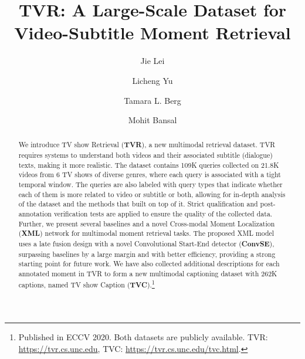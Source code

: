 \documentclass[runningheads]{llncs}
\begin{document}
\pagestyle{headings}
\mainmatter
\def\ECCVSubNumber{100}  

\title{TVR: A Large-Scale Dataset for Video-Subtitle Moment Retrieval} 

\begin{comment}
\titlerunning{ECCV-20 submission ID \ECCVSubNumber} 
\authorrunning{ECCV-20 submission ID \ECCVSubNumber} 
\author{Anonymous ECCV submission}
\institute{Paper ID \ECCVSubNumber}
\end{comment}


\author{Jie Lei \and Licheng Yu \and Tamara L. Berg \and Mohit Bansal}
\maketitle

\begin{abstract}
We introduce TV show Retrieval (\textbf{TVR}), a new multimodal retrieval dataset.
TVR requires systems to understand both videos and their associated subtitle (dialogue) texts, making it more realistic.
The dataset contains 109K queries collected on 21.8K videos from 6 TV shows of diverse genres, where each query is associated with a tight temporal window. 
The queries are also labeled with query types that indicate whether each of them is more related to video or subtitle or both, allowing for in-depth analysis of the dataset and the methods that built on top of it.
Strict qualification and post-annotation verification tests are applied to ensure the quality of the collected data. 
Further, we present several baselines and a novel Cross-modal Moment Localization (\textbf{XML}) network for multimodal moment retrieval tasks.
The proposed XML model uses a late fusion design with a novel Convolutional Start-End detector (\textbf{ConvSE}), surpassing baselines by a large margin and with better efficiency, providing a strong starting point for future work.
We have also collected additional descriptions for each annotated moment in TVR to form a new multimodal captioning dataset with 262K captions, named TV show Caption (\textbf{TVC}).\footnote{\footnotesize Published in ECCV 2020. Both datasets are publicly available. TVR: \url{https://tvr.cs.unc.edu}, TVC: \url{https://tvr.cs.unc.edu/tvc.html}.}
\end{abstract}
\end{document}
